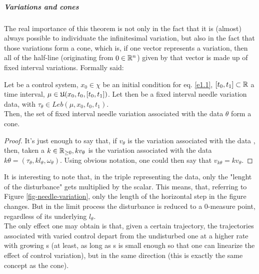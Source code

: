 \subparagraph[4.10]{Variations and cones} The real importance of this theorem is not only in the fact that it is (almost) always possible to individuate the infinitesimal variation, but also in the fact that those variations form a cone, which is, if one vector represents a variation, then all of the half-line (originating from $0\in\mathbb{R}^n$) given by that vector is made up of fixed interval variations. Formally said: \\

\begin{teo}
	Let \controlSystem\space be a control system, $x_0\in\chi$ be an initial condition for eq. \eqref{e1.1}, $[t_0,t_1]\subset\mathbb{R}$ a time interval, $\mu\in\mathfrak{U}(x_0,t_0,[t_0,t_1])$. Let then \fivData\space be a fixed interval needle variation data, with $\tau_\theta\in Leb(\mu,x_0,t_0,t_1)$.\\
Then, the set of fixed interval needle variation associated with the data $\theta$ form a cone.
	\label{4-10}
	\label{T6}
\end{teo}
\begin{proof}
	It's just enough to say that, if $v_\theta$ is the variation associated with the data \fivData, then, taken a $k\in\mathbb{R}_{\geq0}, kv_\theta$ is the variation associated with the data $k\theta=(\tau_\theta,kl_\theta,\omega_\theta)$. Using obvious notation, one could then say that $v_{k\theta}=kv_\theta$.
\end{proof}
It is interesting to note that, in the triple representing the data, only the "lenght of the disturbance" gets multiplied by the scalar. This means, that, referring to Figure \ref{fig-needle-variation}, only the length of the horizontal step in the figure changes. But in the limit process the disturbance is reduced to a 0-measure point, regardless of its underlying $l_\theta$.\\
The only effect one may obtain is that, given a certain trajectory, the trajectories associated with varied control depart from the undisturbed one at a higher rate with growing s (at least, as long as s is small enough so that one can linearize the effect of control variation), but in the same direction (this is exactly the same concept as the cone).

